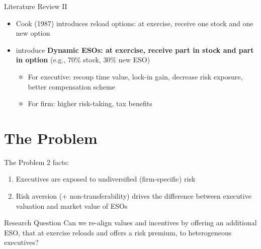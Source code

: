 \documentclass[compress]{beamer}
\begin{document}
\begin{frame}{Literature Review II}
    \begin{itemize}
        \item Cook (1987) introduces reload options: at exercise, receive one stock and one new option
        \item \citet{huang2013dynamic} introduce \textbf{Dynamic ESOs: at exercise, receive part in stock and part in option} (e.g., 70\% stock, 30\% new ESO)
        \begin{itemize}
            \item For executive: recoup time value, lock-in gain, decrease risk exposure, better compensation scheme
            \item For firm: higher risk-taking, tax benefits
        \end{itemize}
    \end{itemize}
\end{frame}


\section{The Problem}
\begin{frame}{The Problem}
    2 facts:
    \begin{enumerate}
        \item Executives are exposed to undiversified (firm-specific) risk
        \item Risk aversion (+ non-transferability) drives the difference between executive valuation and market value of ESOs
    \end{enumerate}
    \vspace*{10pt}

    \begin{block}{Research Question}
        Can we re-align values and incentives by offering an additional ESO, that at exercise reloads and offers a risk premium, to heterogeneous executives?
    \end{block}  
\end{frame}
\end{document}
